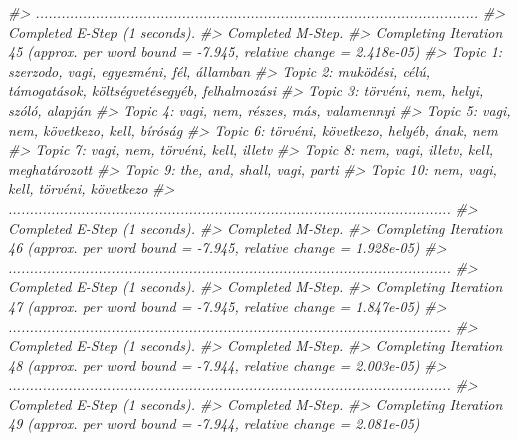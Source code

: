 \documentclass[
]{book}
\newenvironment{Shaded}{\begin{snugshade}}{\end{snugshade}}
\newcommand{\CommentTok}[1]{\textcolor[rgb]{0.56,0.35,0.01}{\textit{#1}}}
\begin{document}
\begin{Shaded}
\begin{Highlighting}[]
\CommentTok{\#\textgreater{} .......................................................................................................}
\CommentTok{\#\textgreater{} Completed E{-}Step (1 seconds). }
\CommentTok{\#\textgreater{} Completed M{-}Step. }
\CommentTok{\#\textgreater{} Completing Iteration 45 (approx. per word bound = {-}7.945, relative change = 2.418e{-}05) }
\CommentTok{\#\textgreater{} Topic 1: szerzodo, vagi, egyezméni, fél, államban }
\CommentTok{\#\textgreater{}  Topic 2: muködési, célú, támogatások, költségvetésegyéb, felhalmozási }
\CommentTok{\#\textgreater{}  Topic 3: törvéni, nem, helyi, szóló, alapján }
\CommentTok{\#\textgreater{}  Topic 4: vagi, nem, részes, más, valamennyi }
\CommentTok{\#\textgreater{}  Topic 5: vagi, nem, következo, kell, bíróság }
\CommentTok{\#\textgreater{}  Topic 6: törvéni, következo, helyéb, ának, nem }
\CommentTok{\#\textgreater{}  Topic 7: vagi, nem, törvéni, kell, illetv }
\CommentTok{\#\textgreater{}  Topic 8: nem, vagi, illetv, kell, meghatározott }
\CommentTok{\#\textgreater{}  Topic 9: the, and, shall, vagi, parti }
\CommentTok{\#\textgreater{}  Topic 10: nem, vagi, kell, törvéni, következo }
\CommentTok{\#\textgreater{} .......................................................................................................}
\CommentTok{\#\textgreater{} Completed E{-}Step (1 seconds). }
\CommentTok{\#\textgreater{} Completed M{-}Step. }
\CommentTok{\#\textgreater{} Completing Iteration 46 (approx. per word bound = {-}7.945, relative change = 1.928e{-}05) }
\CommentTok{\#\textgreater{} .......................................................................................................}
\CommentTok{\#\textgreater{} Completed E{-}Step (1 seconds). }
\CommentTok{\#\textgreater{} Completed M{-}Step. }
\CommentTok{\#\textgreater{} Completing Iteration 47 (approx. per word bound = {-}7.945, relative change = 1.847e{-}05) }
\CommentTok{\#\textgreater{} .......................................................................................................}
\CommentTok{\#\textgreater{} Completed E{-}Step (1 seconds). }
\CommentTok{\#\textgreater{} Completed M{-}Step. }
\CommentTok{\#\textgreater{} Completing Iteration 48 (approx. per word bound = {-}7.944, relative change = 2.003e{-}05) }
\CommentTok{\#\textgreater{} .......................................................................................................}
\CommentTok{\#\textgreater{} Completed E{-}Step (1 seconds). }
\CommentTok{\#\textgreater{} Completed M{-}Step. }
\CommentTok{\#\textgreater{} Completing Iteration 49 (approx. per word bound = {-}7.944, relative change = 2.081e{-}05) }

\end{Highlighting}
\end{Shaded}
\end{document}
